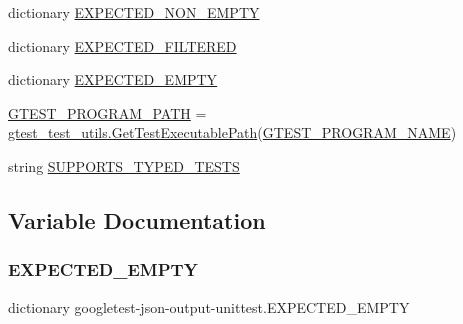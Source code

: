 \begin{DoxyCompactItemize}
\item 
dictionary \mbox{\hyperlink{namespacegoogletest-json-output-unittest_a558a6c2af202fbbad4bcc27f4c05c700}{E\+X\+P\+E\+C\+T\+E\+D\+\_\+\+N\+O\+N\+\_\+\+E\+M\+P\+TY}}
\item 
dictionary \mbox{\hyperlink{namespacegoogletest-json-output-unittest_ab26a4eac32a5edbebfe692ebb45286b2}{E\+X\+P\+E\+C\+T\+E\+D\+\_\+\+F\+I\+L\+T\+E\+R\+ED}}
\item 
dictionary \mbox{\hyperlink{namespacegoogletest-json-output-unittest_af895388d271e081833e8fe5a2e441a3d}{E\+X\+P\+E\+C\+T\+E\+D\+\_\+\+E\+M\+P\+TY}}
\item 
\mbox{\hyperlink{namespacegoogletest-json-output-unittest_a14a7165c04f407b3355881c3574a5492}{G\+T\+E\+S\+T\+\_\+\+P\+R\+O\+G\+R\+A\+M\+\_\+\+P\+A\+TH}} = \mbox{\hyperlink{namespacegtest__test__utils_a89ed3717984a80ffbb7a9c92f71b86a2}{gtest\+\_\+test\+\_\+utils.\+Get\+Test\+Executable\+Path}}(\mbox{\hyperlink{namespacegoogletest-json-output-unittest_a2ea5e671c35eb461f41c0a5d720fed9d}{G\+T\+E\+S\+T\+\_\+\+P\+R\+O\+G\+R\+A\+M\+\_\+\+N\+A\+ME}})
\item 
string \mbox{\hyperlink{namespacegoogletest-json-output-unittest_a8e55aed21c8823df35607daf335c4962}{S\+U\+P\+P\+O\+R\+T\+S\+\_\+\+T\+Y\+P\+E\+D\+\_\+\+T\+E\+S\+TS}}
\end{DoxyCompactItemize}


\subsection{Variable Documentation}
\mbox{\label{namespacegoogletest-json-output-unittest_af895388d271e081833e8fe5a2e441a3d}} 
\subsubsection{\texorpdfstring{EXPECTED\_EMPTY}{EXPECTED\_EMPTY}}
{\footnotesize\ttfamily dictionary googletest-\/json-\/output-\/unittest.\+E\+X\+P\+E\+C\+T\+E\+D\+\_\+\+E\+M\+P\+TY}


